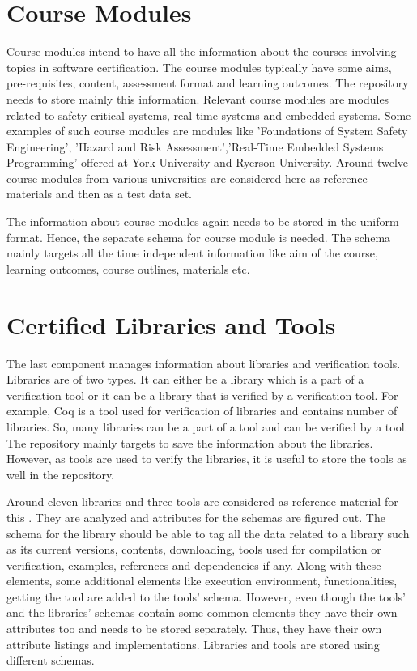 \documentclass[11pt,letterpaper]{report}
\begin{document}
 \section{Course Modules}Course modules intend to have all the information about the courses involving topics in software certification. The course modules typically have some aims, pre-requisites, content, assessment format and learning outcomes. The repository needs to store mainly this information. Relevant course modules are modules related to safety critical systems, real time systems and embedded systems. Some examples of such course modules are modules like 'Foundations of System Safety Engineering', 'Hazard and Risk Assessment’,'Real-Time Embedded Systems Programming' offered at York University and Ryerson University. Around twelve course modules from various universities are considered here as reference materials and then as a test data set.
 
 The information about course modules again needs to be stored in the uniform format. Hence, the separate schema for course module is needed. The schema mainly targets all the time independent information like aim of the course, learning outcomes, course outlines, materials etc. 
 \section{Certified Libraries and Tools}
  The last component manages information about libraries and verification tools. Libraries are of two types. It can either be a library which is a part of a verification tool or it can be a library that is verified by a verification tool. For example, Coq is a tool used for verification of libraries and contains number of libraries. So, many libraries can be a part of a tool and can be verified by a tool. The repository mainly targets to save the information about the libraries. However, as tools are used to verify the libraries, it is useful to store the tools as well in the repository.
 
 Around eleven libraries and three tools are considered as reference material for this \cite{Alea,DFC, MCHIP, BCastleJava, BSharp,Glibc,COQ,CADP,STL,NUSMV,SMPS}. They are analyzed and attributes for the schemas are figured out. The schema for the library should be able to tag all the data related to a library such as its current versions, contents, downloading, tools used for compilation or verification, examples, references and dependencies if any. Along with these elements, some additional elements like execution environment, functionalities, getting the tool are added to the tools' schema. However, even though the tools' and the libraries' schemas contain some common elements they have their own attributes too and needs to be stored separately. Thus, they have their own attribute listings and implementations. Libraries and tools are stored using different schemas.  
\end{document}
